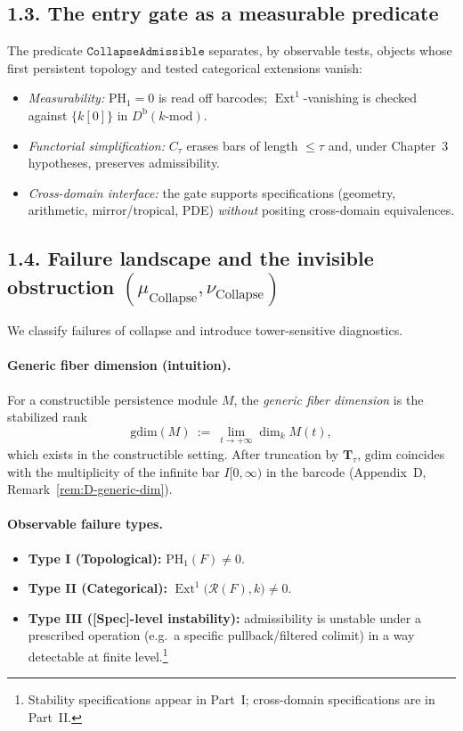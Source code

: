 \documentclass[11pt]{article}
\DeclareMathOperator{\Ext}{Ext}
\numberwithin{equation}{section}
\theoremstyle{definition}
\begin{document}
\subsection*{1.3. The entry gate as a measurable predicate}
The predicate $\texttt{CollapseAdmissible}$ separates, by observable tests, objects whose first persistent topology and tested categorical extensions vanish:
\begin{itemize}
  \item \emph{Measurability:} $\mathrm{PH}_1{=}0$ is read off barcodes; $\Ext^1$-vanishing is checked against $\{k[0]\}$ in $D^{\mathrm{b}}(k\text{-mod})$.
  \item \emph{Functorial simplification:} $C_\tau$ erases bars of length $\le \tau$ and, under Chapter~3 hypotheses, preserves admissibility.
  \item \emph{Cross-domain interface:} the gate supports specifications (geometry, arithmetic, mirror/tropical, PDE) \emph{without} positing cross-domain equivalences.
\end{itemize}

\subsection*{1.4. Failure landscape and the invisible obstruction
\texorpdfstring{$(\mu_{\mathrm{Collapse}},\nu_{\mathrm{Collapse}})$}{(mu,nu)}}\label{sec:typeIV}
We classify failures of collapse and introduce tower-sensitive diagnostics.

\paragraph{Generic fiber dimension (intuition).}
For a constructible persistence module $M$, the \emph{generic fiber dimension} is the stabilized rank
\[
\mathrm{gdim}(M)\ :=\ \lim_{t\to+\infty}\dim_k M(t),
\]
which exists in the constructible setting. After truncation by $\mathbf{T}_\tau$, $\mathrm{gdim}$ coincides with the multiplicity of the infinite bar $I[0,\infty)$ in the barcode (Appendix~D, Remark~\ref{rem:D-generic-dim}).

\paragraph{Observable failure types.}
\begin{itemize}
  \item \textbf{Type I (Topological):} $\mathrm{PH}_1(F)\neq 0$.
  \item \textbf{Type II (Categorical):} $\Ext^1\!\big(\mathcal{R}(F),k\big)\neq 0$.
  \item \textbf{Type III ([Spec]-level instability):} admissibility is unstable under a prescribed operation (e.g.\ a specific pullback/filtered colimit) in a way detectable at finite level.\footnote{Stability specifications appear in Part~I; cross-domain specifications are in Part~II.}
\end{itemize}
\end{document}

